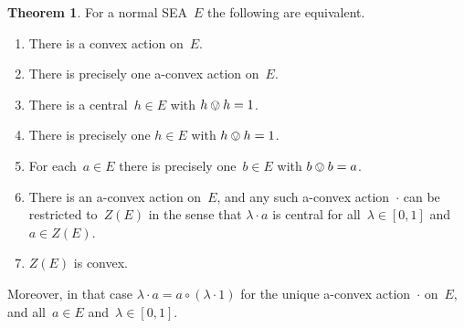 \documentclass[a4paper, onecolumn, accepted=2020-12-22]{quantumarticle}
\newcommand{\mult}{\mathop{\circ}}
\newcounter{counter}
\theoremstyle{definition}
\newtheorem{theorem}[counter]{Theorem}
\begin{document}
\begin{theorem}\label{thm-a-convex-thm}
For a normal SEA~$E$ the following are equivalent.
\begin{enumerate}
\item
\label{thm-convex-convex}
There is a convex action on~$E$.
\item
\label{thm-convex-unique-a-convex}
There is precisely one a-convex action on~$E$.
\item
\label{thm-convex-central-half}
There is a central~$h\in E$ with $h\ovee h=1$.
\item
\label{thm-convex-unique-half}
There is precisely one $h\in E$ with $h\ovee h = 1$.
\item
\label{thm-convex-unique-halves}
For each~$a\in E$ there is precisely one~$b\in E$
with $b\ovee b = a$.
\item
\label{thm-convex-restriction-to-center}
There is an a-convex action on~$E$,
and any such a-convex action~$\cdot$ 
can be restricted to~$Z(E)$
in the sense that  $\lambda\cdot a$ is central
  for all~$\lambda\in[0,1]$ and~$a\in Z(E)$.
\item
\label{thm-convex-center-convex}
$Z(E)$ is convex.
\end{enumerate}
Moreover, in that case
  $\lambda\cdot a = a\mult(\lambda\cdot 1)$
for the unique a-convex action~$\cdot$ on~$E$,
and all~$a\in E$ and~$\lambda\in [0,1]$.
\end{theorem}
\end{document}
